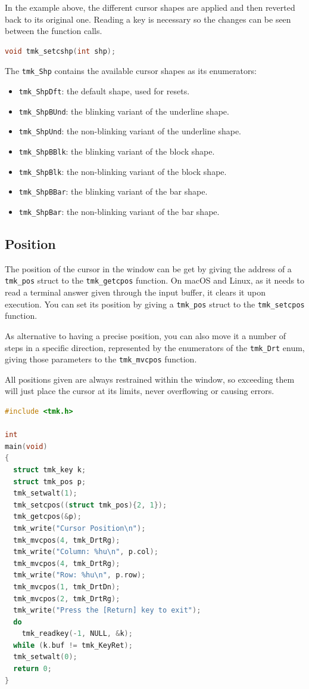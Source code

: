 \documentclass{report}
\begin{document}
In the example above, the different cursor shapes are applied and then reverted back to its original one. Reading a key is necessary so the changes can be seen between the function calls.
\begin{lstlisting}[language=c,caption=the declaration of the \texttt{tmk\_setcshp} function.]
void tmk_setcshp(int shp);
\end{lstlisting}

The \texttt{tmk\_Shp} contains the available cursor shapes as its enumerators:

\begin{itemize}
  \item \texttt{tmk\_ShpDft}: the default shape, used for resets.
  \item \texttt{tmk\_ShpBUnd}: the blinking variant of the underline shape.
  \item \texttt{tmk\_ShpUnd}: the non-blinking variant of the underline shape.
  \item \texttt{tmk\_ShpBBlk}: the blinking variant of the block shape.
  \item \texttt{tmk\_ShpBlk}: the non-blinking variant of the block shape.
  \item \texttt{tmk\_ShpBBar}: the blinking variant of the bar shape.
  \item \texttt{tmk\_ShpBar}: the non-blinking variant of the bar shape.
\end{itemize}
\subsection{Position}
The position of the cursor in the window can be get by giving the address of a \texttt{tmk\_pos} struct to the \texttt{tmk\_getcpos} function. On macOS and Linux, as it needs to read a terminal answer given through the input buffer, it clears it upon execution. You can set its position by giving a \texttt{tmk\_pos} struct to the \texttt{tmk\_setcpos} function.

As alternative to having a precise position, you can also move it a number of steps in a specific direction, represented by the enumerators of the \texttt{tmk\_Drt} enum, giving those parameters to the \texttt{tmk\_mvcpos} function.

All positions given are always restrained within the window, so exceeding them will just place the cursor at its limits, never overflowing or causing errors.
\begin{lstlisting}[language=c,caption=an example that interacts with the cursor position in different ways.]
#include <tmk.h>

int
main(void)
{
  struct tmk_key k;
  struct tmk_pos p;
  tmk_setwalt(1);
  tmk_setcpos((struct tmk_pos){2, 1});
  tmk_getcpos(&p);
  tmk_write("Cursor Position\n");
  tmk_mvcpos(4, tmk_DrtRg);
  tmk_write("Column: %hu\n", p.col);
  tmk_mvcpos(4, tmk_DrtRg);
  tmk_write("Row: %hu\n", p.row);
  tmk_mvcpos(1, tmk_DrtDn);
  tmk_mvcpos(2, tmk_DrtRg);
  tmk_write("Press the [Return] key to exit");
  do
    tmk_readkey(-1, NULL, &k);
  while (k.buf != tmk_KeyRet);
  tmk_setwalt(0);
  return 0;
}
\end{lstlisting}
\end{document}
